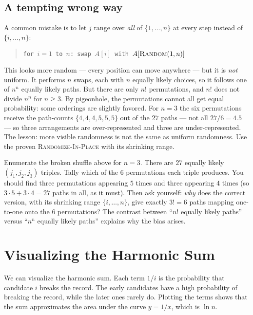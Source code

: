 \subsection*{A tempting wrong way}

\begin{trapbox}
A common mistake is to let $j$ range over \emph{all} of $\{1,\dots,n\}$
at every step instead of $\{i,\dots,n\}$:
\begin{quote}
\texttt{for $i = 1$ to $n$: swap $A[i]$ with $A[\textsc{Random}(1,n)]$}
\end{quote}
This looks more random --- every position can move anywhere --- but it is
\emph{not} uniform. It performs $n$ swaps, each with $n$ equally likely choices,
so it follows one of $n^n$ equally likely paths. But there are only $n!$
permutations, and $n!$ does not divide $n^n$ for $n \ge 3$. By pigeonhole, the
permutations cannot all get equal probability: some orderings are slightly
favored. For $n=3$ the six permutations receive the path-counts
$\{4,4,4,5,5,5\}$ out of the $27$ paths --- not all $27/6 = 4.5$ --- so three
arrangements are over-represented and three are under-represented. The lesson: more
visible randomness is not the same as uniform randomness. Use the proven
\textsc{Randomize-In-Place} with its shrinking range.
\end{trapbox}

\begin{walkbox}
Enumerate the broken shuffle above for $n=3$. There are
$27$ equally likely $(j_1,j_2,j_3)$ triples. Tally which of the $6$ permutations
each triple produces. You should find three permutations appearing $5$ times and
three appearing $4$ times (so $3\cdot 5 + 3\cdot 4 = 27$ paths in all, as it must).
Then ask yourself: \emph{why} does the correct version,
with its shrinking range $\{i,\dots,n\}$, give exactly $3! = 6$ paths mapping
one-to-one onto the $6$ permutations? The contrast between ``$n!$ equally likely paths''
versus ``$n^n$ equally likely paths'' explains why the bias arises.
\end{walkbox}

\section{Visualizing the Harmonic Sum}

We can visualize the harmonic sum. Each term $1/i$ is the probability that candidate $i$ breaks the record. The early candidates have a high probability of breaking the record, while the later ones rarely do. Plotting the terms shows that the sum approximates the area under the curve $y = 1/x$, which is $\ln n$.

